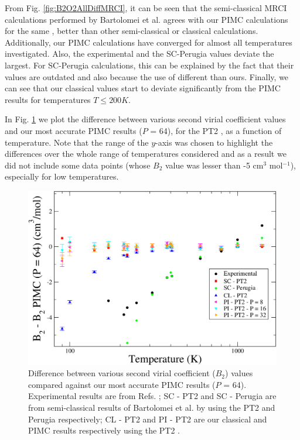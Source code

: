     From Fig. \ref{fig:B2O2AllDiffMRCI}, it can be seen that the semi-classical MRCI calculations performed by Bartolomei et al. \cite{Bartolomei2010} agrees with our PIMC calculations for the same \PESs{}, better than other semi-classical or classical calculations. Additionally, our PIMC calculations have converged for almost all temperatures investigated. Also, the experimental and the SC-Perugia values deviate the largest. For SC-Perugia calculations, this can be explained by the fact that their values are outdated and also because the use of different \PESs{} than ours. Finally, we can see that our classical values start to deviate significantly from the PIMC results for temperatures $T \le 200K$.
    
    In Fig. \ref{fig:B2O2AllDiffPT2} we plot the difference between various second virial coefficient values and our most accurate PIMC results ($P$ = 64), for the PT2 \PESs{}, as a function of temperature. Note that the range of the $y$-axis was chosen to highlight the differences over the whole range of temperatures considered and as a result we did not include some data points (whose $B_2$ value was lesser than -5 cm$^3$ mol$^{-1}$), especially for low temperatures. 
    \begin{figure}[!htbp]
        \centering
        \includegraphics[scale=0.20,keepaspectratio]{Chapter-6/Figures/B2O2AllDiffPT2.png}
        \caption{Difference between various second virial coefficient ($B_2$) values compared against our most accurate PIMC results ($P$ = 64). Experimental results are from Refs. \cite{Bartolomei2010,Dymond}; SC - PT2 and SC - Perugia are from semi-classical results of Bartolomei et al. \cite{Bartolomei2010} by using the PT2 and Perugia \PESs{} \cite{Aquilanti1999} respectively; CL - PT2 and PI - PT2 are our classical and PIMC results respectively using the PT2 \PESs{}.}
        \label{fig:B2O2AllDiffPT2}
    \end{figure}

